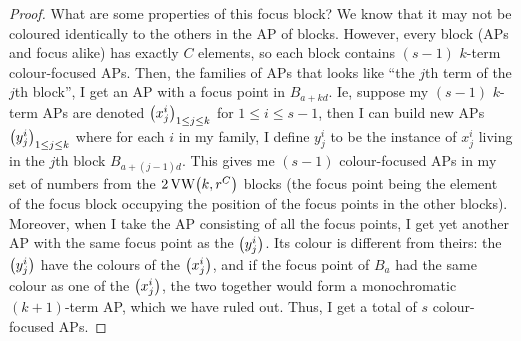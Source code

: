 \begin{proof}
    What are some properties of this focus block? We know that it may not be coloured identically to the others in the AP of blocks. However, every block (APs and focus alike) has exactly $C$ elements, so each block contains $(s - 1)$ $k$-term colour-focused APs. Then, the families of APs that looks like ``the $j$th term of the $j$th block'', I get an AP with a focus point in $B_{a + kd}$. Ie, suppose my $(s - 1)$ $k$-term APs are denoted $\left( x^i_j \right)_{1 \leq j \leq k}$ for $1 \leq i \leq s - 1$, then I can build new APs $\left( y^i_j \right)_{1 \leq j \leq k}$ where for each $i$ in my family, I define $y^i_j$ to be the instance of $x^i_j$ living in the $j$th block $B_{a + (j - 1)d}$. This gives me $(s - 1)$ colour-focused APs in my set of numbers from the $2\operatorname{VW}\!\left( k, r^C \right)$ blocks (the focus point being the element of the focus block occupying the position of the focus points in the other blocks). Moreover, when I take the AP consisting of all the focus points, I get yet another AP with the same focus point as the $\left( y^i_j \right)$. Its colour is different from theirs: the $\left( y^i_j \right)$ have the colours of the $\left( x^i_j \right)$, and if the focus point of $B_a$ had the same colour as one of the $\left( x^i_j \right)$, the two together would form a monochromatic $(k + 1)$-term AP, which we have ruled out. Thus, I get a total of $s$ colour-focused APs.
    

\end{proof}
